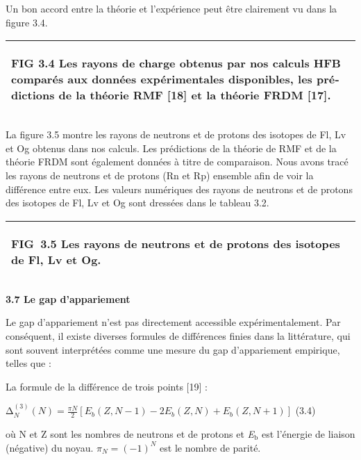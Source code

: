 \documentclass[a4paper]{article}
\providecommand\textsubscript[1]{\ensuremath{{}_{\text{#1}}}}
\begin{document}
Un bon accord entre la théorie et l’expérience peut être clairement vu dans la figure 3.4. 

\begin{flushleft}
\tablefirsthead{}
\tablehead{}
\tabletail{}
\tablelasttail{}
\begin{supertabular}{|m{6.40316in}|}
\hline
{\begin{french} FIG 3.4 Les rayons de charge obtenus par nos calculs HFB comparés aux données expérimentales disponibles, les prédictions de la théorie RMF [18] et la théorie FRDM [17].\end{french}}\\\hline
\end{supertabular}
\end{flushleft}
La figure 3.5 montre les rayons de neutrons et de protons des isotopes de Fl, Lv et Og obtenus dans nos calculs. Les prédictions de la théorie de RMF et de la théorie FRDM sont également données à titre de comparaison. Nous  avons tracé les rayons de neutrons et de protons (Rn et Rp) ensemble afin de voir la différence entre eux. Les valeurs numériques des rayons de neutrons et de protons des isotopes de Fl, Lv et Og sont dressées dans le tableau 3.2.

\begin{flushleft}
\tablefirsthead{}
\tablehead{}
\tabletail{}
\tablelasttail{}
\begin{supertabular}{|m{6.22476in}|}
\hline
{\begin{french} FIG~3.5 Les rayons de neutrons et de protons des isotopes de Fl, Lv et Og.\end{french}}

\\\hline
\end{supertabular}
\end{flushleft}
\textbf{3.7 Le gap d’appariement}

 Le gap d’appariement n’est pas directement accessible expérimentalement. Par conséquent, il existe diverses formules de différences finies dans la littérature, qui sont souvent interprétées comme une mesure du gap d’appariement empirique, telles que :

La formule de la différence de trois points [19] :

  $∆_N^{\left(3\right)}\left(N\right)=\frac{\mathit{πN}} 2[E_b\left(Z,N-1\right)-2E_b\left(Z,N\right)+E_b\left(Z,N+1\right)]$ (3.4)

où N et Z sont les nombres de neutrons et de protons et \textit{E}\textit{\textsubscript{b}} est l’énergie de liaison (négative) du noyau.  $π_N=(-1)^N$  est le nombre de parité.
\end{document}

